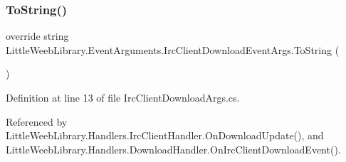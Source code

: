 \subsubsection{\texorpdfstring{To\+String()}{ToString()}}
{\footnotesize\ttfamily override string Little\+Weeb\+Library.\+Event\+Arguments.\+Irc\+Client\+Download\+Event\+Args.\+To\+String (\begin{DoxyParamCaption}{ }\end{DoxyParamCaption})}



Definition at line 13 of file Irc\+Client\+Download\+Args.\+cs.



Referenced by Little\+Weeb\+Library.\+Handlers.\+Irc\+Client\+Handler.\+On\+Download\+Update(), and Little\+Weeb\+Library.\+Handlers.\+Download\+Handler.\+On\+Irc\+Client\+Download\+Event().


